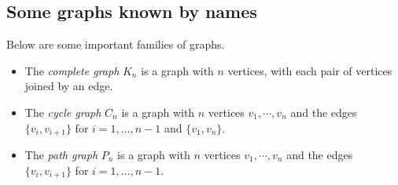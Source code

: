 

\setcounter{section}{1}
\setcounter{subsection}{2}
\setcounter{dfn}{1}

\subsection{Some graphs known by names}
Below are some important families of graphs.
\begin{itemize}
\item
The \emph{complete graph} $K_n$ is a graph with $n$ vertices, with each pair of vertices joined by an edge.
\item
The \emph{cycle graph} $C_n$ is a graph with $n$ vertices $v_1, \cdots, v_n$ and the edges $\{v_i, v_{i+1}\}$ for $i = 1, \ldots, n-1$ and $\{v_1, v_n\}$.
\item
The \emph{path graph} $P_n$ is a graph with $n$ vertices $v_1, \cdots, v_n$ and the edges $\{v_i, v_{i+1}\}$ for $i = 1, \ldots, n-1$.
\end{itemize}


